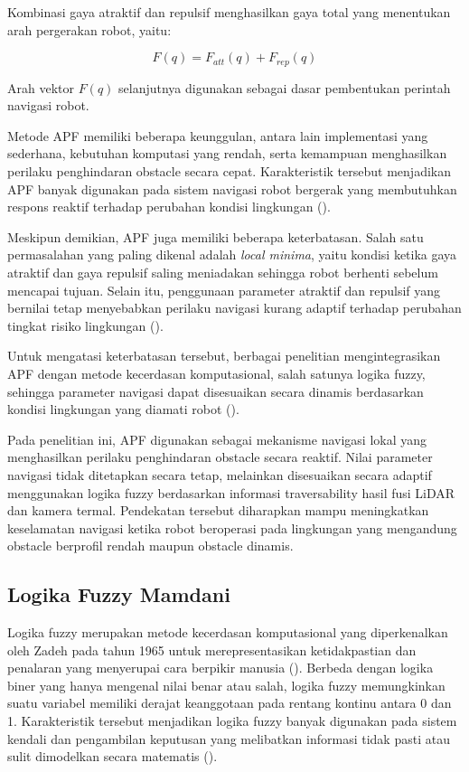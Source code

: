 Kombinasi gaya atraktif dan repulsif menghasilkan gaya total yang menentukan arah pergerakan robot, yaitu:

\begin{equation}
F(q)=F_{att}(q)+F_{rep}(q)
\label{eq:f_total}
\end{equation}

Arah vektor $F(q)$ selanjutnya digunakan sebagai dasar pembentukan perintah navigasi robot.

Metode APF memiliki beberapa keunggulan, antara lain implementasi yang sederhana, kebutuhan komputasi yang rendah, serta kemampuan menghasilkan perilaku penghindaran obstacle secara cepat. Karakteristik tersebut menjadikan APF banyak digunakan pada sistem navigasi robot bergerak yang membutuhkan respons reaktif terhadap perubahan kondisi lingkungan (\cite{Ge2002,Zhang2023}).

Meskipun demikian, APF juga memiliki beberapa keterbatasan. Salah satu permasalahan yang paling dikenal adalah \textit{local minima}, yaitu kondisi ketika gaya atraktif dan gaya repulsif saling meniadakan sehingga robot berhenti sebelum mencapai tujuan. Selain itu, penggunaan parameter atraktif dan repulsif yang bernilai tetap menyebabkan perilaku navigasi kurang adaptif terhadap perubahan tingkat risiko lingkungan (\cite{Ge2002,Zhang2023}).

Untuk mengatasi keterbatasan tersebut, berbagai penelitian mengintegrasikan APF dengan metode kecerdasan komputasional, salah satunya logika fuzzy, sehingga parameter navigasi dapat disesuaikan secara dinamis berdasarkan kondisi lingkungan yang diamati robot (\cite{Masehian2010,Zhang2023}).

Pada penelitian ini, APF digunakan sebagai mekanisme navigasi lokal yang menghasilkan perilaku penghindaran obstacle secara reaktif. Nilai parameter navigasi tidak ditetapkan secara tetap, melainkan disesuaikan secara adaptif menggunakan logika fuzzy berdasarkan informasi traversability hasil fusi LiDAR dan kamera termal. Pendekatan tersebut diharapkan mampu meningkatkan keselamatan navigasi ketika robot beroperasi pada lingkungan yang mengandung obstacle berprofil rendah maupun obstacle dinamis.

\subsection{Logika Fuzzy Mamdani}

Logika fuzzy merupakan metode kecerdasan komputasional yang diperkenalkan oleh Za\-deh pada tahun 1965 untuk merepresentasikan ketidakpastian dan penalaran yang menyerupai cara berpikir manusia (\cite{Zadeh1965}). Berbeda dengan logika biner yang hanya mengenal nilai benar atau salah, logika fuzzy memungkinkan suatu variabel memiliki derajat keanggotaan pada rentang kontinu antara 0 dan 1. Karakteristik tersebut menjadikan logika fuzzy banyak digunakan pada sistem kendali dan pengambilan keputusan yang melibatkan informasi tidak pasti atau sulit dimodelkan secara matematis (\cite{Mendel1995,Ross2010}).

